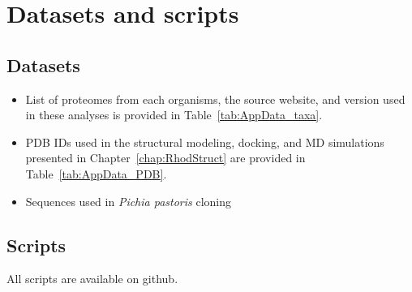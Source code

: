 \chapter{Datasets and scripts}
\label{app:Data}
\section*{Datasets}
\begin{itemize}
  \item List of proteomes from each organisms, the source website, and version used in these analyses is provided in Table~\ref{tab:AppData_taxa}.\\
  \item PDB IDs used in the structural modeling, docking, and MD simulations presented in Chapter~\ref{chap:RhodStruct} are provided in Table~\ref{tab:AppData_PDB}.\\
  \item Sequences used in \textit{Pichia pastoris} cloning \\
\end{itemize}
\section*{Scripts}
All scripts are available on github.
